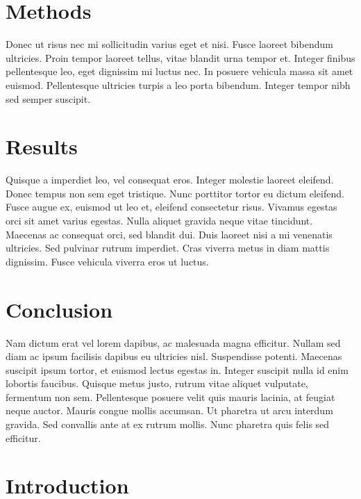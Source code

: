 \documentclass[12pt,halfline,a4paper,]{ouparticle}
\begin{document}
\hypertarget{methods}{%
\section{Methods}\label{methods}}

Donec ut risus nec mi sollicitudin varius eget et nisi. Fusce laoreet bibendum ultricies.
Proin tempor laoreet tellus, vitae blandit urna tempor et. Integer finibus pellentesque
leo, eget dignissim mi luctus nec. In posuere vehicula massa sit amet euismod.
Pellentesque ultricies turpis a leo porta bibendum. Integer tempor nibh sed semper
suscipit.

\hypertarget{results}{%
\section{Results}\label{results}}

Quisque a imperdiet leo, vel consequat eros. Integer molestie laoreet eleifend. Donec
tempus non sem eget tristique. Nunc porttitor tortor eu dictum eleifend. Fusce augue ex,
euismod ut leo et, eleifend consectetur risus. Vivamus egestas orci sit amet varius
egestas. Nulla aliquet gravida neque vitae tincidunt. Maecenas ac consequat orci, sed
blandit dui. Duis laoreet nisi a mi venenatis ultricies. Sed pulvinar rutrum imperdiet.
Cras viverra metus in diam mattis dignissim. Fusce vehicula viverra eros ut luctus.

\hypertarget{conclusion}{%
\section{Conclusion}\label{conclusion}}

Nam dictum erat vel lorem dapibus, ac malesuada magna efficitur. Nullam sed diam ac ipsum
facilisis dapibus eu ultricies nisl. Suspendisse potenti. Maecenas suscipit ipsum tortor,
et euismod lectus egestas in. Integer suscipit nulla id enim lobortis faucibus. Quisque
metus justo, rutrum vitae aliquet vulputate, fermentum non sem. Pellentesque posuere velit
quis mauris lacinia, at feugiat neque auctor. Mauris congue mollis accumsan. Ut pharetra
ut arcu interdum gravida. Sed convallis ante at ex rutrum mollis. Nunc pharetra quis felis
sed efficitur.

\hypertarget{introduction-1}{%
\section{Introduction}\label{introduction-1}}
\end{document}
